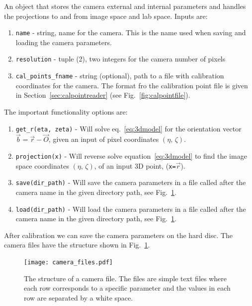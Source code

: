 \documentclass[10pt,a4paper]{article}
\begin{document}
An object that stores the camera external and internal parameters and handles the projections to and from image space and lab space. Inputs are:

\begin{enumerate}
	\item \texttt{name} - string, name for the camera. This is the name used when saving and loading the camera parameters.
	\item \texttt{resolution} - tuple (2), two integers for the camera number of pixels
	\item \texttt{cal\_points\_fname} - string (optional), path to a file with calibration coordinates for the camera. The format fro the calibration point file is given in Section~\ref{sec:calpointreader} (see Fig.~\ref{fig:calpointfile}).
\end{enumerate}


The important functionality options are:


\begin{enumerate}
	\item \texttt{get\_r(eta, zeta)} - Will solve eq.~\ref{eq:3dmodel} for the orientation vector $\vec{b} = \vec{r} - \vec{O}$, given an input of pixel coordinates $(\eta, \, \zeta)$.
	
	\item \texttt{projection(x)} - Will reverse solve equation~\eqref{eq:3dmodel} to find the image space coordinates $(\eta, \, \zeta)$, of an input 3D point, (\texttt{x=}$\vec{r}$).
	
	\item \texttt{save(dir\_path)} - Will save the camera parameters in a file called after the camera name in the given directory path, see Fig.~\ref{fig:camfiles}.
	
	\item \texttt{load(dir\_path)} - Will load the camera parameters in a file called after the camera name in the given directory path, see Fig.~\ref{fig:camfiles}.
\end{enumerate}



After calibration we can save the camera parameters on the hard disc. The camera files have the structure shown in Fig.~\ref{fig:camfiles}.

\begin{figure}[!ht]
	\centering
	\texttt{[image: camera\_files.pdf]}
	\caption{The structure of a camera file. The files are simple text files where each row corresponds to a specific parameter and the values in each row are separated by a white space. \label{fig:camfiles}}
\end{figure}
\end{document}
